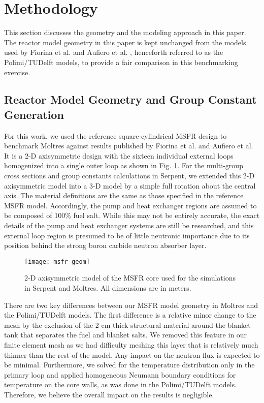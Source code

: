 \section{Methodology}

This section discusses the geometry and the modeling approach in this paper.
The reactor model geometry in this paper is kept unchanged from the models
used by Fiorina et al. \cite{fiorina_modelling_2014} and Aufiero et al.
\cite{aufiero_development_2014}, henceforth referred to as the
Polimi/TUDelft models, to provide a fair comparison in this
benchmarking exercise.

\subsection{Reactor Model Geometry and Group Constant Generation}

For this work, we used the reference square-cylindrical \gls{MSFR} design to
benchmark Moltres against results published by Fiorina et al. and Aufiero et
al. It is a 2-D axisymmetric design with the sixteen individual external loops
homogenized into a single outer loop as shown in Fig. \ref{fig:msfrgeom}. For
the multi-group
cross sections and group constants calculations in Serpent, we extended this
2-D axisymmetric model into a 3-D model by a simple full rotation about the
central axis. The material definitions are the same as those specified in the
reference \gls{MSFR} model. Accordingly, the pump and heat exchanger regions
are assumed to be composed of 100\% fuel salt. While this may not be entirely
accurate, the exact details of the pump and heat exchanger systems are still
be researched, and this external loop region is presumed to be of little
neutronic importance due to its position behind the strong boron carbide
neutron absorber layer.
%
\begin{figure}[htb!] 
	\centering
	\texttt{[image: msfr-geom]}
	\caption{2-D axisymmetric model of the \gls{MSFR} core used for the
	simulations in Serpent and Moltres. All dimensions are in meters.
	\cite{brovchenko_neutronic_2019}}
	\label{fig:msfrgeom}
\end{figure}

There are two key differences between our \gls{MSFR} model geometry in
Moltres and the Polimi/TUDelft models. The first difference is a relative
minor change to the mesh by the exclusion of the 2 cm thick structural
material around the blanket tank that separates the fuel and blanket salts.
We removed this feature in our finite element mesh as we had difficulty
meshing this layer that is relatively much thinner than the rest of the model.
Any impact on the
neutron flux is expected to be minimal. Furthermore, we solved for the
temperature distribution only in the primary loop and applied homogeneous
Neumann boundary conditions for temperature on the core walls, as was done in
the Polimi/TUDelft models. Therefore, we believe the overall impact on the
results is negligible.

